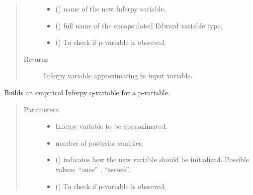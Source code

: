 \documentclass[letterpaper,10pt,english]{sphinxmanual}
\begin{document}
\begin{fulllineitems}
\begin{fulllineitems}
\begin{quote}
\begin{description}
\begin{itemize}
\item {} 
 () \textendash{} name of the new Inferpy variable.

\item {} 
 () \textendash{} full name of the encapsulated Edward variable type.

\item {} 
 () \textendash{} To check if p-variable is observed.

\end{itemize}

\item[{Returns}] \leavevmode
Inferpy variable approximating in input variable.

\end{description}\end{quote}

\end{fulllineitems}


\begin{fulllineitems}
\label{\detokenize{modules/inferpy.inferences:inferpy.inferences.qmodel.Qmodel.new_qvar_empirical}}
Builds an empirical Inferpy q-variable for a p-variable.
\begin{quote}\begin{description}
\item[{Parameters}] \leavevmode\begin{itemize}
\item {} 
 \textendash{} Inferpy variable to be approximated.

\item {} 
 \textendash{} number of posterior samples.

\item {} 
 () \textendash{} indicates how the new variable should be initialized. Possible values: “ones” , “zeroes”.

\item {} 
 () \textendash{} To check if p-variable is observed.


\end{itemize}
\end{description}
\end{quote}
\end{fulllineitems}
\end{fulllineitems}
\end{document}
